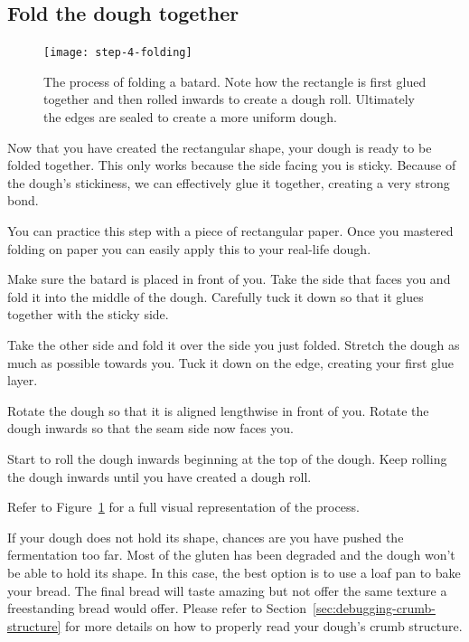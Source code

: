 \subsection[Folding]{Fold the dough together}

\begin{figure}[htb!]
  \centering
  \texttt{[image: step-4-folding]}
  \caption[Step 4 of shaping process]{The process of folding a batard. Note
      how the rectangle is first glued together and then rolled inwards to
      create a dough roll. Ultimately the edges are sealed to create a more
      uniform dough.}%
  \label{fig:shaping-folding}
\end{figure}

Now that you have created the rectangular shape, your dough
is ready to be folded together. This only works because the side
facing you is sticky. Because of the dough's stickiness,
we can effectively glue it together, creating a very
strong bond.

You can practice this step with a piece of rectangular paper.
Once you mastered folding on paper you can easily apply
this to your real-life dough.

Make sure the batard is placed in front of you. Take the side
that faces you and fold it into the middle of the dough. Carefully
tuck it down so that it glues together with the sticky side.

Take the other side and fold it over the side you just folded.
Stretch the dough as much as possible towards you. Tuck it down
on the edge, creating your first glue layer.

Rotate the dough so that it is aligned lengthwise in front of you.
Rotate the dough inwards so that the seam side
now faces you.

Start to roll the dough inwards beginning at the top of the dough.
Keep rolling the dough inwards until you have created a dough roll.

Refer to Figure~\ref{fig:shaping-folding} for a full visual
representation of the process.

If your dough does not hold its shape, chances are you have pushed
the fermentation too far. Most of the gluten has been degraded
and the dough won't be able to hold its shape. In this case,
the best option is to use a loaf pan to bake your bread. The
final bread will taste amazing but not offer the same texture
a freestanding bread would offer. Please refer to
Section~\ref{sec:debugging-crumb-structure} for more
details on how to properly read your dough's crumb structure.

